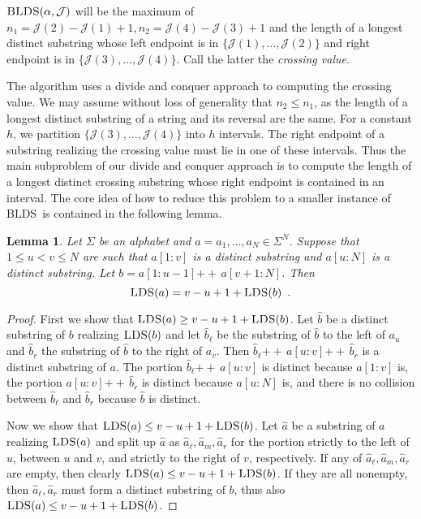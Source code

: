 \documentclass[12pt]{article}
\newcommand{\concat}{\ensuremath{+\!\!\!\!+\,}}
\newcommand{\Jset}{\mathcal{J}}
\newcommand{\blds}{\textsc{BLDS}}
\newcommand{\upto}{\mathbin{:}}
\newcommand{\lds}{\textsc{LDS}}
\newtheorem{lemma}[theorem]{Lemma}
\theoremstyle{definition}
\begin{document}
$\blds(\alpha, \Jset)$ will be the maximum of $n_1 = \Jset(2) - \Jset(1) + 1, n_2 = \Jset(4) - \Jset(3) + 1$ and the length of a longest distinct substring whose left endpoint is in $\{\Jset(1), \ldots, \Jset(2)\}$ and right endpoint is in $\{\Jset(3), \ldots, \Jset(4)\}$.  Call the latter the \emph{crossing value}.

The algorithm uses a divide and conquer approach to computing the crossing value. We may assume without loss of generality that $n_2 \le n_1$, as the length of a longest distinct substring of a string and its reversal are the same.  For a constant $h$, we partition $\{\Jset(3), \ldots, \Jset(4)\}$ into $h$ intervals.  The right endpoint of a substring realizing the crossing value must lie in one of these intervals.
Thus the main subproblem of our divide and conquer approach is to compute the length of a longest distinct crossing substring whose right endpoint is contained in an interval.  The core idea of how to reduce this problem to a smaller instance of \blds\ is contained in the following lemma.

\begin{lemma}
\label{lem:lds}
Let $\Sigma$ be an alphabet and $a = a_1, \ldots, a_N \in \Sigma^N$. 
Suppose that $1 \leq u < v \leq N$ are such that $a[1\upto v]$ is a distinct substring and $a[u \upto N]$ is a distinct substring.  
Let $b = a[1\upto u-1] \concat a[v+1\upto N]$.  Then
\[
\lds(a) = v - u + 1 + \lds(b) \enspace .
\]
\end{lemma}


\begin{proof}
First we show that $\lds(a) \ge v - u + 1 + \lds(b)$.  
Let $\hat b$ be a distinct substring of $b$ realizing $\lds(b)$ and let $\hat b_\ell$ be the substring of $\hat b$ to the left of $a_{u}$ and $\hat b_r$ the substring of $\hat b$ to the right of $a_{v}$.  Then $\hat b_\ell \concat a[u \upto v] \concat \hat b_r$ is a distinct substring of $a$.  The portion $\hat b_\ell \concat a[u \upto v]$ is distinct because $a[1 \upto v]$ is, the portion $a[u \upto v] \concat \hat b_r$ is distinct because $a[u \upto N]$ is, and there is no collision between $\hat b_\ell$ and $\hat b_r$ because $\hat b$ is distinct.

Now we show that $\lds(a) \le v - u + 1 +\lds(b)$.
Let $\hat a$ be a substring of $a$ realizing $\lds(a)$ and split up $\hat a$ as $\hat a_\ell, \hat a_m, \hat a_r$ for the portion strictly to the left of $u$, between $u$ and $v$, and strictly to the right of $v$, respectively.  If any of 
$\hat a_\ell, \hat a_m, \hat a_r$ are empty, then clearly $\lds(a) \le v - u + 1 +\lds(b)$.  
If they are all nonempty, then $\hat a_\ell, \hat a_r$ must form a distinct substring of $b$, thus also $\lds(a) \le v - u + 1 +\lds(b)$.
\end{proof}
\end{document}
